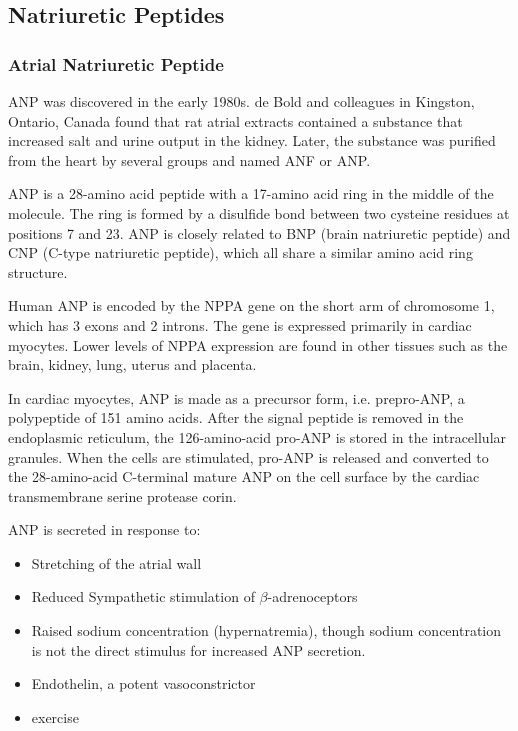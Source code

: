 \documentclass[12pt,a4paper,onecolumn]{article}
\begin{document}
\subsection{Natriuretic Peptides}


\subsubsection{Atrial Natriuretic Peptide}
ANP was discovered in the early 1980s. de Bold and colleagues in Kingston, Ontario, Canada found that rat atrial extracts contained a substance that increased salt and urine output in the kidney.\citep{deBoldetal1981} Later, the substance was purified from the heart by several groups and named ANF or ANP.\citep{deBold1985}

ANP is a 28-amino acid peptide with a 17-amino acid ring in the middle of the molecule. The ring is formed by a disulfide bond between two cysteine residues at positions 7 and 23. ANP is closely related to BNP (brain natriuretic peptide) and CNP (C-type natriuretic peptide), which all share a similar amino acid ring structure.

Human ANP is encoded by the NPPA gene on the short arm of chromosome 1, which has 3 exons and 2 introns. The gene is expressed primarily in cardiac myocytes. Lower levels of NPPA expression are found in other tissues such as the brain, kidney, lung, uterus and placenta.

In cardiac myocytes, ANP is made as a precursor form, i.e. prepro-ANP, a polypeptide of 151 amino acids. After the signal peptide is removed in the endoplasmic reticulum, the 126-amino-acid pro-ANP is stored in the intracellular granules. When the cells are stimulated, pro-ANP is released and converted to the 28-amino-acid C-terminal mature ANP on the cell surface by the cardiac transmembrane serine protease corin.\citep{Yanetal1999}\citep{Yanetal2000}

ANP is secreted in response to:
\begin{itemize}
    \item Stretching of the atrial wall \citep{Widmaieretal2008}
    \item Reduced Sympathetic stimulation of $\beta$-adrenoceptors
    \item Raised sodium concentration (hypernatremia), though sodium concentration is not the direct stimulus for increased ANP secretion. \citep{Widmaieretal2008}
    \item Endothelin, a potent vasoconstrictor
    \item exercise \citep{Kokkonenetal2002}
\end{itemize}
\end{document}
